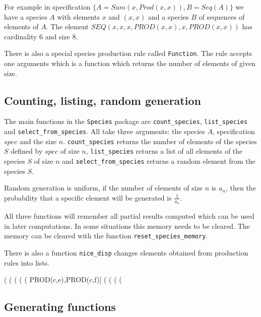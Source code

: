 \documentclass[10pt]{article}
\newcommand{\command}[1]{\texttt{#1}}
\begin{document}
For example in specification $\{A=Sum(x, Prod(x,x)), B=Seq(A)\}$ we
have a species $A$ with elements $x$ and $(x,x)$ and a species $B$ of
sequences of elements of $A$. The element $SEQ(x, x, x, PROD(x,x), x,
PROD(x,x))$ has cardinality 6 and size 8.

There is also a special species production rule called \command{Function}.
The rule accepts one arguments which is a function which returns the
number of elements of given size.

\subsection{Counting, listing, random generation}

The main functions in the \command{Species} package are
\command{count\_species}, \command{list\_species} and
\command{select\_from\_species}. All take three arguments: the species
$A$, specification $spec$ and the size $n$.  \command{count\_species}
returns the number of elements of the species $S$ defined by $spec$ of
size $n$, \command{list\_species} returns a list of all elements of
the species $S$ of size $n$ and \command{select\_from\_species}
returns a random element from the species $S$.

Random generation is uniform, if the number of elements of size $n$ is
$a_n$, then the probability that a specific element will be generated
is $\frac{1}{a_n}$.

All three functions will remember all partial results computed which
can be used in later computations. In some situations this memory
needs to be cleared. The memory can be cleared with the function
\command{reset\_species\_memory}.

There is also a function \command{nice\_disp} changes elements
obtained from production rules into lists.

\begin{example}
(%
(%
(%
(%
(%
       PROD(c,e),PROD(c,f)]
(%
(%
(%
(%
\end{example}

\subsection{Generating functions}
\end{document}
